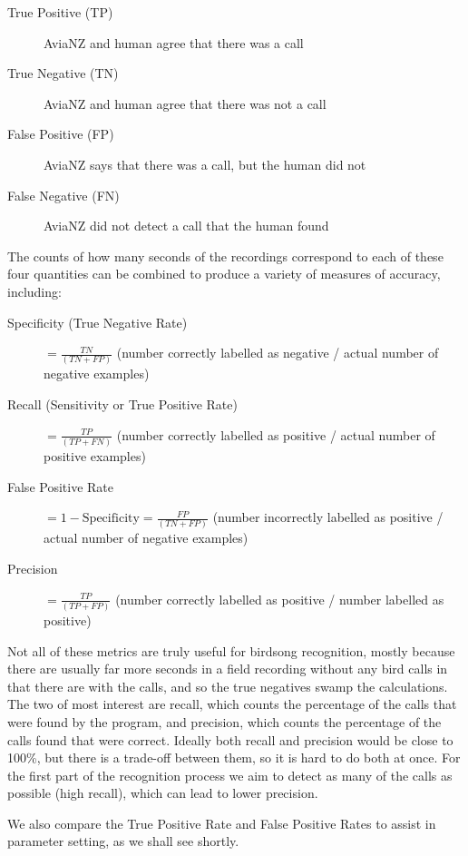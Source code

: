\documentclass{scrartcl}
\begin{document}
\begin{description}
\item[True Positive (TP)] AviaNZ and human agree that there was a call 
\item[True Negative (TN)] AviaNZ and human agree that there was not a call
\item[False Positive (FP)] AviaNZ says that there was a call, but the human did not
\item[False Negative (FN)] AviaNZ did not detect a call that the human found
\end{description}

The counts of how many seconds of the recordings correspond to each of these four quantities can be combined to produce a variety of measures of accuracy, including:

\begin{description}
\item[Specificity (True Negative Rate)] $= \frac{TN}{(TN + FP)}$ (number correctly labelled as negative / actual number of negative examples)
\item[Recall (Sensitivity or True Positive Rate)] $= \frac{TP}{(TP + FN)}$ (number correctly labelled as positive / actual number of positive examples) 
\item[False Positive Rate] $= 1 - \mathrm{Specificity} = \frac{FP}{(TN + FP)}$ (number incorrectly labelled as positive / actual number of negative examples)
\item[Precision] $= \frac{TP}{(TP + FP)}$ (number correctly labelled as positive / number labelled as positive)
\end{description}

Not all of these metrics are truly useful for birdsong recognition, mostly because there are usually far more seconds in a field recording without any bird calls in that there are with the calls, and so the true negatives swamp the calculations. The two of most interest are recall, which counts the percentage of the calls that were found by the program, and precision, which counts the percentage of the calls found that were correct. Ideally both recall and precision would be close to 100\%, but there is a trade-off between them, so it is hard to do both at once. For the first part of the recognition process we aim to detect as many of the calls as possible (high recall), which can lead to lower precision. 

We also compare the True Positive Rate and False Positive Rates to assist in parameter setting, as we shall see shortly.
\end{document}
